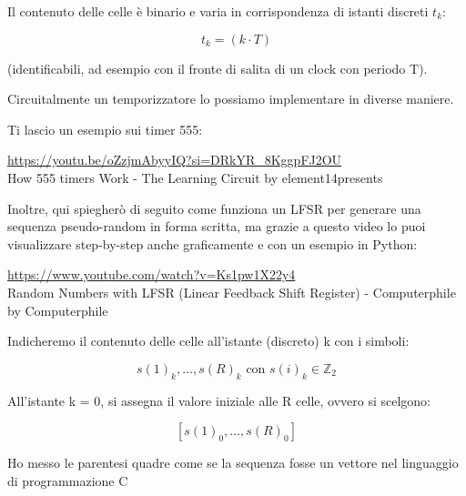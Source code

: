 Il contenuto delle celle è binario e varia in corrispondenza di istanti discreti $t_k$: 

{
    \Large 
    \begin{equation}
        t_k = (k \cdot T)
    \end{equation}
}

(identificabili, ad esempio con il fronte di salita di un clock con periodo T). \newline 

\begin{tcolorbox}
    Circuitalmente un temporizzatore lo possiamo implementare in diverse maniere. \newline 

    Ti lascio un esempio sui timer 555: \newline 

    \url{https://youtu.be/oZzjmAbyyIQ?si=DRkYR_8KggpFJ2OU} \\
    How 555 timers Work - The Learning Circuit by element14presents \newline 

    Inoltre, qui spiegherò di seguito come funziona un LFSR per generare una sequenza pseudo-random in forma scritta, 
    ma grazie a questo video lo puoi visualizzare step-by-step anche graficamente e con un esempio in Python: \newline 

    \url{https://www.youtube.com/watch?v=Ks1pw1X22y4}\\
    Random Numbers with LFSR (Linear Feedback Shift Register) - Computerphile by Computerphile 
\end{tcolorbox}

Indicheremo il contenuto delle celle all'istante (discreto) k con i simboli: 

{
    \Large 
    \begin{equation}
        s(1)_{k}, \dots, s(R)_k \text{ con } s(i)_k \in \mathbb{Z}_2
    \end{equation}
}

All'istante k = 0, 
si assegna il valore iniziale alle R celle, 
ovvero si scelgono: 

{
    \Large 
    \begin{equation}
        \left[ s(1)_0, \dots, s(R)_0 \right]
    \end{equation}
}

\begin{tcolorbox}
    Ho messo le parentesi quadre come se la sequenza fosse 
    un vettore nel linguaggio di programmazione C
\end{tcolorbox}


